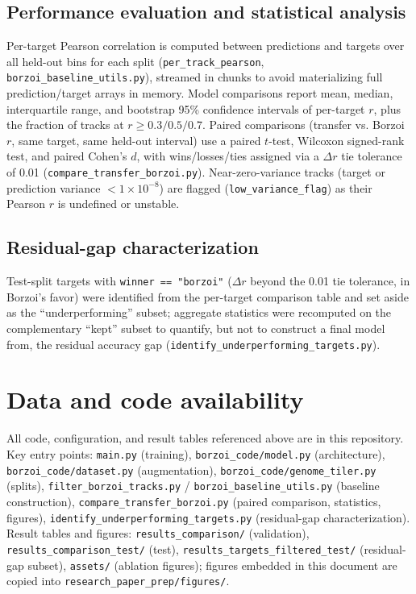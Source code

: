\documentclass[10pt]{article}
\begin{document}
\subsection*{Performance evaluation and statistical analysis}
Per-target Pearson correlation is computed between predictions and targets over all held-out bins for each split (\texttt{per\_track\_pearson}, \texttt{borzoi\_baseline\_utils.py}), streamed in chunks to avoid materializing full prediction/target arrays in memory. Model comparisons report mean, median, interquartile range, and bootstrap 95\% confidence intervals of per-target $r$, plus the fraction of tracks at $r \geq 0.3/0.5/0.7$. Paired comparisons (transfer vs. Borzoi $r$, same target, same held-out interval) use a paired $t$-test, Wilcoxon signed-rank test, and paired Cohen's $d$, with wins/losses/ties assigned via a $\Delta r$ tie tolerance of 0.01 (\texttt{compare\_transfer\_borzoi.py}). Near-zero-variance tracks (target or prediction variance $< 1\times10^{-8}$) are flagged (\texttt{low\_variance\_flag}) as their Pearson $r$ is undefined or unstable.

\subsection*{Residual-gap characterization}
Test-split targets with \texttt{winner == "borzoi"} ($\Delta r$ beyond the 0.01 tie tolerance, in Borzoi's favor) were identified from the per-target comparison table and set aside as the ``underperforming'' subset; aggregate statistics were recomputed on the complementary ``kept'' subset to quantify, but not to construct a final model from, the residual accuracy gap (\texttt{identify\_underperforming\_targets.py}).

\section*{Data and code availability}
All code, configuration, and result tables referenced above are in this repository. Key entry points: \texttt{main.py} (training), \texttt{borzoi\_code/model.py} (architecture), \texttt{borzoi\_code/dataset.py} (augmentation), \texttt{borzoi\_code/genome\_tiler.py} (splits), \texttt{filter\_borzoi\_tracks.py} / \texttt{borzoi\_baseline\_utils.py} (baseline construction), \texttt{compare\_transfer\_borzoi.py} (paired comparison, statistics, figures), \texttt{identify\_underperforming\_targets.py} (residual-gap characterization). Result tables and figures: \texttt{results\_comparison/} (validation), \texttt{results\_comparison\_test/} (test), \texttt{results\_targets\_filtered\_test/} (residual-gap subset), \texttt{assets/} (ablation figures); figures embedded in this document are copied into \texttt{research\_paper\_prep/figures/}.
\end{document}
